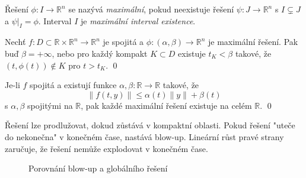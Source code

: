 \begin{definition}
Řešení $\phi: I \to \mathbb{R}^n$ se nazývá \emph{maximální}, pokud neexistuje řešení $\psi: J \to \mathbb{R}^n$ s $I \subsetneq J$ a $\psi|_I = \phi$. Interval $I$ je \emph{maximální interval existence}.
\end{definition}

\begin{theorem}
Nechť $f: D \subset \mathbb{R} \times \mathbb{R}^n \to \mathbb{R}^n$ je spojitá a $\phi: (\alpha, \beta) \to \mathbb{R}^n$ je maximální řešení. Pak buď $\beta = +\infty$, nebo pro každý kompakt $K \subset D$ existuje $t_K < \beta$ takové, že $(t, \phi(t)) \notin K$ pro $t > t_K$.
\qed
\end{theorem}

\begin{theorem}
Je-li $f$ spojitá a existují funkce $\alpha, \beta: \mathbb{R} \to \mathbb{R}$ takové, že
\[
\|f(t,y)\| \leq \alpha(t)\|y\| + \beta(t)
\]
s $\alpha, \beta$ spojitými na $\mathbb{R}$, pak každé maximální řešení existuje na celém $\mathbb{R}$.
\qed
\end{theorem}

\begin{intuition}
Řešení lze prodlužovat, dokud zůstává v kompaktní oblasti. Pokud řešení "uteče do nekonečna" v konečném čase, nastává blow-up. Lineární růst pravé strany zaručuje, že řešení nemůže explodovat v konečném čase.
\end{intuition}

\begin{figure}[h]
\centering
{}
\caption{Porovnání blow-up a globálního řešení}
\label{fig:blowup-global}
\end{figure}

